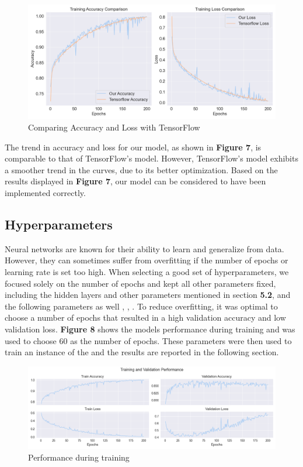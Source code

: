 \begin{figure}[H]
    \centering
    \includegraphics[scale=0.45]{figures_for_report/tensorflow_vs_our}
    \captionsetup{justification=centering,margin=2cm}
    \caption{Comparing Accuracy and Loss with TensorFlow}
\end{figure}

The trend in accuracy and loss for our model, as shown in \textbf{Figure 7}, is comparable to that of TensorFlow's model.
However, TensorFlow's model exhibits a smoother trend in the curves, due to its better optimization.
Based on the results displayed in \textbf{Figure 7}, our model can be considered to have been implemented correctly.

\subsection{Hyperparameters}
Neural networks are known for their ability to learn and generalize from data.
However, they can sometimes suffer from overfitting if the number of epochs or learning rate is set too high.
When selecting a good set of hyperparameters, we focused solely on the number of epochs and kept all other parameters fixed, including the hidden layers and other parameters mentioned in section \textbf{5.2}, and the following parameters as well , , .
To reduce overfitting, it was optimal to choose a number of epochs that resulted in a high validation accuracy and low validation loss.
\textbf{Figure 8} shows the models performance during training and was used to choose $60$ as the number of epochs.
These parameters were then used to train an instance of the  and the results are reported in the following section.
\begin{figure}[H]
    \centering
    \includegraphics[scale=0.45]{figures_for_report/train_validation_nn_performance}
    \captionsetup{justification=centering,margin=2cm}
    \caption{Performance during training}\label{fig:figure}
\end{figure}

